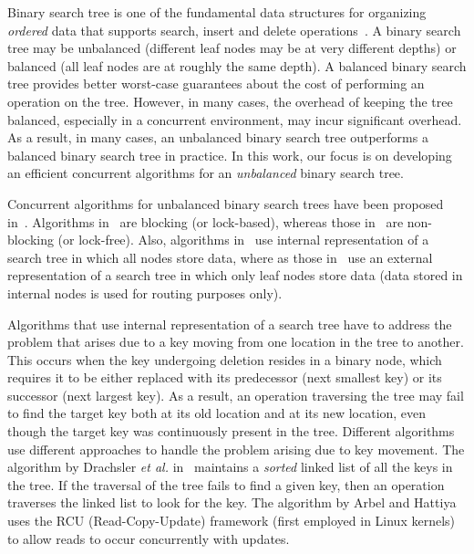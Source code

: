 Binary search tree is one of the fundamental data structures for organizing \emph{ordered} data that supports search, insert and delete operations~\cite{CorLei+:1991:MIT}. A binary search tree may be unbalanced (different leaf nodes may be at very different depths) or balanced (all leaf nodes are at roughly the same depth). A balanced binary search tree provides better worst-case guarantees about the cost of performing an operation on the tree. However, in many cases, the overhead of keeping the tree balanced, especially in a concurrent environment, may incur significant overhead. As a result, in many cases, an unbalanced binary search tree  outperforms a balanced binary search tree in practice. In this work, our focus is on developing an efficient concurrent algorithms for an \emph{unbalanced} binary search tree. 

Concurrent algorithms for unbalanced binary search trees have been proposed in~\cite{EllFat+:2010:PODC,HowJon:2012:SPAA,NatMit:2014:PPoPP,DraVec+:2014:PPoPP,EllFat+:2014:PODC,ChaDan+:2014:PODC,ArbAtt:2014:PODC}. Algorithms in~\cite{DraVec+:2014:PPoPP,ArbAtt:2014:PODC} are blocking (or lock-based), whereas those in~\cite{EllFat+:2010:PODC,HowJon:2012:SPAA,NatMit:2014:PPoPP,EllFat+:2014:PODC,ChaDan+:2014:PODC} are non-blocking (or lock-free). Also, algorithms in~\cite{HowJon:2012:SPAA,DraVec+:2014:PPoPP,ArbAtt:2014:PODC,ChaDan+:2014:PODC} use internal representation of a search tree in which all nodes store data, where as those in~\cite{EllFat+:2010:PODC,NatMit:2014:PPoPP,EllFat+:2014:PODC} use an external representation of  a search tree in which only leaf nodes store data (data stored in internal nodes is used for routing purposes only).

Algorithms that use internal representation of a search tree have to address the problem that arises due to a key moving from one location in the tree to another. This occurs when the key undergoing deletion resides in a binary node, which requires it to be either replaced with its predecessor (next smallest key) or its successor (next largest key). As a result, an operation traversing the tree may fail to find the target key both at its old location and at its new location, even though the target key was continuously present in the tree. Different algorithms use different approaches to handle the problem arising due to key movement. The algorithm by Drachsler \emph{et al.} in~\cite{DraVec+:2014:PPoPP} maintains a \emph{sorted} linked list of all the keys in the tree. If the traversal of the tree fails to find a given key, then an operation traverses the linked list to look for the key. The algorithm by Arbel and Hattiya~\cite{ArbAtt:2014:PODC} uses the RCU (Read-Copy-Update) framework (first employed in Linux kernels) to allow reads to occur concurrently with updates.

